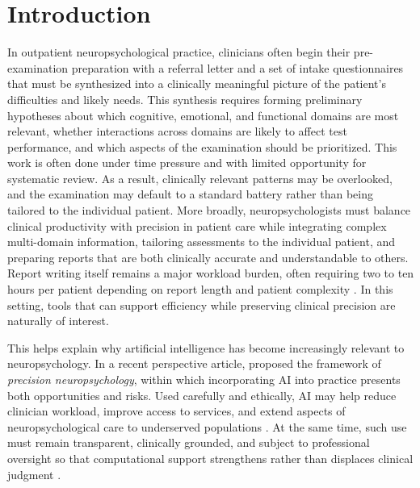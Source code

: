 \documentclass[11pt,a4paper]{article}
\begin{document}
\bigskip

\section{Introduction}
\label{sec:introduction}

In outpatient neuropsychological practice, clinicians often begin their pre-examination preparation with a referral letter and a set of intake questionnaires that must be synthesized into a clinically meaningful picture of the patient's difficulties and likely needs. This synthesis requires forming preliminary hypotheses about which cognitive, emotional, and functional domains are most relevant, whether interactions across domains are likely to affect test performance, and which aspects of the examination should be prioritized. This work is often done under time pressure and with limited opportunity for systematic review. As a result, clinically relevant patterns may be overlooked, and the examination may default to a standard battery rather than being tailored to the individual patient. More broadly, neuropsychologists must balance clinical productivity with precision in patient care while integrating complex multi-domain information, tailoring assessments to the individual patient, and preparing reports that are both clinically accurate and understandable to others. Report writing itself remains a major workload burden, often requiring two to ten hours per patient depending on report length and patient complexity \citep{Postal2018ReportWriting}. In this setting, tools that can support efficiency while preserving clinical precision are naturally of interest.

This helps explain why artificial intelligence has become increasingly relevant to neuropsychology. In a recent perspective article, \textcite{LundervoldAJ2025} proposed the framework of \textit{precision neuropsychology}, within which incorporating AI into practice presents both opportunities and risks. Used carefully and ethically, AI may help reduce clinician workload, improve access to services, and extend aspects of neuropsychological care to underserved populations \citep{Kronenberger2025}. At the same time, such use must remain transparent, clinically grounded, and subject to professional oversight so that computational support strengthens rather than displaces clinical judgment \citep{LundervoldAJ2025, DeRightPuente2026}.
\end{document}
